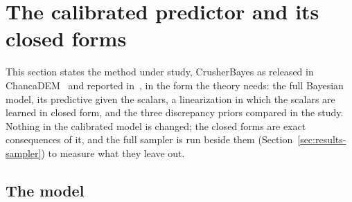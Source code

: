 \section{The calibrated predictor and its closed forms}\label{sec:method}

This section states the method under study, CrusherBayes as released in ChancaDEM~\productrelease{} and reported
in~\cite{cb002}, in the form the theory needs: the full Bayesian model, its predictive given the scalars, a linearization in
which the scalars are learned in closed form, and the three discrepancy priors compared in the study. Nothing in the
calibrated model is changed; the closed forms are exact consequences of it, and the full sampler is run beside them
(Section~\ref{sec:results-sampler}) to measure what they leave out.

\subsection{The model}

